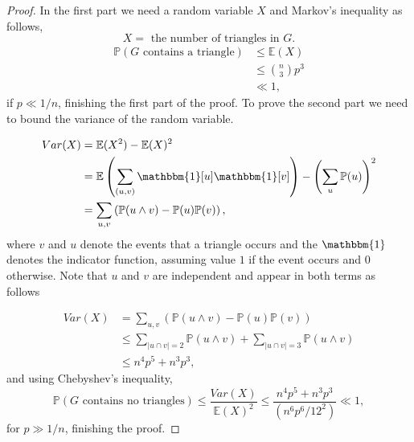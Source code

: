 \documentclass[12pt,twoside,a4paper,bibliography=totocnumbered]{book}
\numberwithin{equation}{section}
\theoremstyle{remark}
\begin{document}
\begin{proof}
In the first part we need a random variable $X$ and  Markov's inequality as follows,
$$ X = \text{ the number of triangles in } G.$$
\begin{align*}
\mathbb{P}(G\text{ contains a triangle}) &\leq \mathbb{E}(X)\\
& \leq \binom{n}{3}p^3 \\
& \ll 1,
\end{align*}
if $ p \ll 1/n$, finishing the first part of the proof. To prove the second part we need to bound the variance of the random variable.

\begin{align*}
Var(X) &= \mathbb{E}(X^2) - \mathbb{E}(X)^2\\
& = \mathbb{E} \left( \sum_{(u, v)} \mathbbm{1}[u]\mathbbm{1}[v] \right) - \left( \sum_u \mathbb{P}(u) \right) ^2\\
& = \sum_{u,v} \left(\mathbb{P}(u \wedge v) - \mathbb{P}(u)\mathbb{P}(v)\right),
\end{align*}
where $v$ and $u$ denote the events that a triangle occurs and the $\mathbbm{1}$ denotes the indicator function, assuming value $1$ if the event occurs and $0$ otherwise. Note that $u$ and $v$ are independent and appear in both terms as follows

\begin{align*}
Var(X) &= \sum_{u,v} \left(\mathbb{P}(u \wedge v) - \mathbb{P}(u)\mathbb{P}(v)\right)\\
& \leq \sum_{|u \cap v| = 2}\mathbb{P}(u \wedge v) + \sum_{|u \cap v| = 3}\mathbb{P}(u \wedge v)\\
&\leq n^4 p^5 + n^3 p^3,
\end{align*}
and using Chebyshev's inequality,
$$\mathbb{P}(G \text{ contains no triangles}) \leq \frac{Var(X)}{\mathbb{E}(X)^2} \leq \frac{n^4p^5 + n^3p^3 }{(n^6p^6/12^2)} \ll 1,$$
for $p \gg 1/n$, finishing the proof.
 \end{proof}
\end{document}
